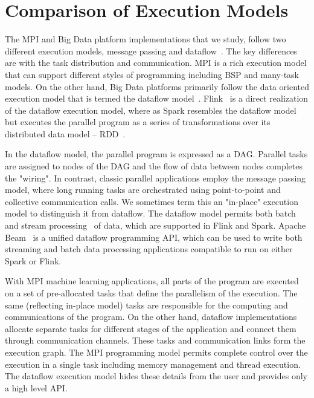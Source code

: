 \documentclass[10pt, conference, compsocconf]{IEEEtran}
\begin{document}
\section{Comparison of Execution Models} \label{sec:exec_models}The \ac{MPI} and Big Data platform implementations that we study, follow two different execution models, message passing and dataflow~\cite{akidau2015dataflow}. The key differences are with the task distribution and communication. \ac{MPI} is a rich execution model that can support different styles of programming including \ac{BSP} and many-task models. On the other hand, Big Data platforms primarily follow the data oriented execution model that is termed the dataflow model~\cite{akidau2015dataflow}. Flink~\cite{apache_flink} is a direct realization of the dataflow execution model, where as Spark resembles the dataflow model but executes the parallel program as a series of transformations over its distributed data model -- \ac{RDD}~\cite{zaharia2012resilient}.

In the dataflow model, the parallel program is expressed as a \ac{DAG}. Parallel tasks are assigned to nodes of the \ac{DAG} and the flow of data between nodes completes the "wiring". In contrast, classic parallel applications employ the message passing model, where long running tasks are orchestrated using point-to-point and collective communication calls. We sometimes term this an "in-place" execution model to distinguish it from dataflow. The dataflow model permits both batch and stream processing~\cite{zaharia2012discretized} of data, which are supported in Flink and Spark. Apache Beam~\cite{apache_beam} is a unified  dataflow programming \ac{API}, which can be used to write both streaming and batch data processing applications compatible to run on either Spark or Flink. 

With \ac{MPI} machine learning applications, all parts of the program are executed on a set of pre-allocated tasks that define the parallelism of the execution. The same (reflecting in-place model) tasks are responsible for the computing and communications of the program. On the other hand, dataflow implementations allocate separate tasks for different stages of the application and connect them through communication channels. These tasks and communication links form the execution graph. The \ac{MPI}  programming model permits complete control over the execution in a single task including memory management and thread execution. The  dataflow execution model hides these details from the user and provides only a high level \ac{API}. 
\end{document}
